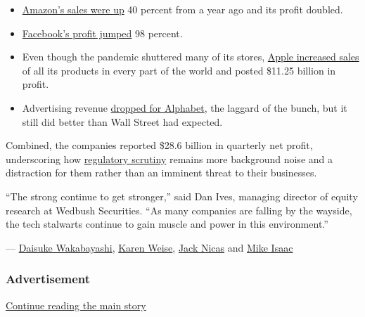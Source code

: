 \begin{itemize}
\item
  \href{https://www.nytimes.com/live/2020/07/30/business/stock-market-today-coronavirus/amazons-earnings-double-as-sales-surge}{Amazon's
  sales were up} 40 percent from a year ago and its profit doubled.
\item
  \href{https://www.nytimes.com/live/2020/07/30/business/stock-market-today-coronavirus/facebook-nearly-doubles-its-profit-but-warns-of-fallout-from-ad-boycotts}{Facebook's
  profit jumped} 98 percent.
\item
  Even though the pandemic shuttered many of its stores,
  \href{https://www.nytimes.com/live/2020/07/30/business/stock-market-today-coronavirus/apple-blows-past-expectations-with-surging-sales-and-profits}{Apple
  increased sales} of all its products in every part of the world and
  posted \$11.25 billion in profit.
\item
  Advertising revenue
  \href{https://www.nytimes.com/live/2020/07/30/business/stock-market-today-coronavirus/alphabets-revenue-drops-but-beats-wall-street-expectations}{dropped
  for Alphabet}, the laggard of the bunch, but it still did better than
  Wall Street had expected.
\end{itemize}

Combined, the companies reported \$28.6 billion in quarterly net profit,
underscoring how
\href{https://www.nytimes.com/2020/07/29/technology/big-tech-hearing-apple-amazon-facebook-google.html}{regulatory
scrutiny} remains more background noise and a distraction for them
rather than an imminent threat to their businesses.

``The strong continue to get stronger,'' said Dan Ives, managing
director of equity research at Wedbush Securities. ``As many companies
are falling by the wayside, the tech stalwarts continue to gain muscle
and power in this environment.''

--- \href{https://www.nytimes.com/by/daisuke-wakabayashi}{Daisuke
Wakabayashi}, \href{https://www.nytimes.com/by/karen-weise}{Karen
Weise}, \href{https://www.nytimes.com/by/jack-nicas}{Jack Nicas} and
\href{https://www.nytimes.com/by/mike-isaac}{Mike Isaac}

\hypertarget{advertisement-3}{%
\subsubsection{Advertisement}\label{advertisement-3}}

\protect\hyperlink{after-dfp-ad-mid4}{Continue reading the main story}

